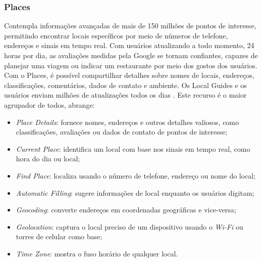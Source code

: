 \subsubsection{Places}

Contempla informações avançadas de mais de 150 milhões de pontos de interesse, permitindo encontrar locais específicos por meio de números de telefone, endereços e sinais em tempo real. Com usuários atualizando a todo momento, 24 horas por dia, as avaliações medidas pela Google se tornam confiantes, capazes de planejar uma viagem ou indicar um restaurante por meio dos gostos dos usuários. Com o Places, é possível compartilhar detalhes sobre nomes de locais, endereços, classificações, comentários, dados de contato e ambiente. Os Local Guides e os usuários enviam milhões de atualizações todos os dias \cite{google:2019}. Este recurso é o maior agrupador de todos, abrange:

\begin{itemize}
    \item \textit{Place Details}: fornece nomes, endereços e outros detalhes valiosos, como classificações, avaliações ou dados de contato de pontos de interesse;
    \item \textit{Current Place}: identifica um local com base nos sinais em tempo real, como hora do dia ou local;
    \item \textit{Find Place}: localiza usando o número de telefone, endereço ou nome do local;
    \item \textit{Automatic Filling}: sugere informações de local enquanto os usuários digitam;
    \item \textit{Geocoding}: converte endereços em coordenadas geográficas e vice-versa;
    \item \textit{Geolocation}: captura o local preciso de um dispositivo usando o \textit{Wi-Fi} ou torres de celular como base;
    \item \textit{Time Zone}: mostra o fuso horário de qualquer local.
\end{itemize}